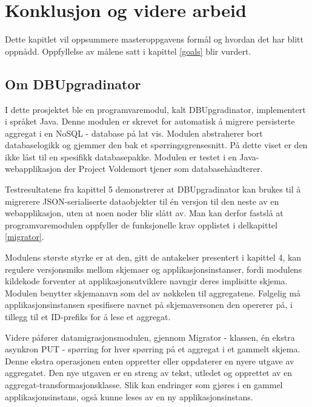 
\chapter{Konklusjon og videre arbeid}

Dette kapitlet vil oppsummere masteroppgavens formål og hvordan det har blitt oppnådd. Oppfyllelse av målene satt i kapittel \ref{goals} blir vurdert.

\section{Om DBUpgradinator}

I dette prosjektet ble en programvaremodul, kalt DBUpgradinator, implementert i språket Java. Denne modulen er skrevet for automatisk å migrere persisterte aggregat i en NoSQL - database på lat vis. Modulen abstraherer bort databaselogikk og gjemmer den bak et spørringsgrensesnitt. På dette viset er den ikke låst til en spesifikk databasepakke. Modulen er testet i en Java-webapplikasjon der Project Voldemort tjener som databasehåndterer.

Testresultatene fra kapittel 5 demonstrerer at DBUpgradinator kan brukes til å migrerere JSON-serialiserte dataobjekter til én versjon til den neste av en webapplikasjon, uten at noen noder blir slått av. Man kan derfor fastslå at programvaremodulen oppfyller de funksjonelle krav opplistet i delkapittel \ref{migrator}.

Modulens største styrke er at den, gitt de antakelser presentert i kapittel 4, kan regulere versjonsmiks mellom skjemaer og applikasjonsinstanser, fordi modulens kildekode forventer at applikasjonsutviklere navngir deres implisitte skjema. Modulen benytter skjemanavn som del av nøkkelen til aggregatene.  Følgelig må applikasjonsinstansen spesifisere navnet på skjemaversonen den opererer på, i tillegg til et ID-prefiks for å lese et aggregat. 

Videre påfører datamigrasjonsmodulen, gjennom Migrator - klassen, én ekstra asynkron PUT - spørring for hver spørring på et aggregat i et gammelt skjema. Denne ekstra operasjonen enten oppretter eller oppdaterer en nyere utgave av aggregatet. Den nye utgaven er en streng av tekst, utledet og opprettet av en aggregat-transformasjonsklasse. Slik kan endringer som gjøres i en gammel applikasjonsinstans, også kunne leses av en ny applikasjonsinstans.

